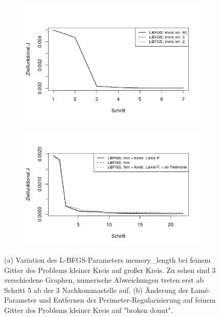 \begin{figure}
	\begin{subfigure}{0.5\textwidth}
	\centering
	\includegraphics[scale=0.48]{plot_circle_bfgs_fine_memlen.jpeg}
	\caption{}	
	\end{subfigure}
	\begin{subfigure}{0.5\textwidth}
	\centering
	\includegraphics[scale=0.48]{plot_donut_bfgs_fine_lame.jpeg}
	\caption{}	
	\end{subfigure}
\caption{(a) Variation des L-BFGS-Parameters \textsf{memory\_length} bei feinem Gitter des Problems kleiner Kreis auf großer Kreis. Zu sehen sind 3 verschiedene Graphen, numerische Abweichungen treten erst ab Schritt 5 ab der 3 Nachkommastelle auf. \newline (b) Änderung der Lamé-Parameter und Entfernen der Perimeter-Regularisierung auf feinem Gitter des Problems kleiner Kreis auf "broken  donut".}
\label{plot_memlen_lame}
\end{figure}

